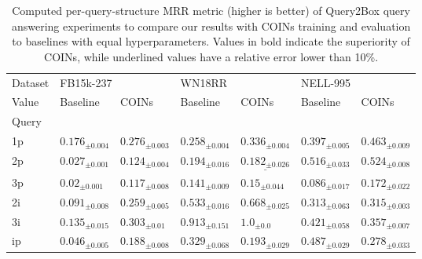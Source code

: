 \begin{table}[H]
  \caption[Computed per-query-structure MRR metric of Query2Box query answering experiments.]{Computed per-query-structure MRR metric (higher is better) of Query2Box query answering experiments to compare our results with COINs training and evaluation to baselines with equal hyperparameters. Values in bold indicate the superiority of COINs, while underlined values have a relative error lower than 10\%.}
  \label{tab:performance_query_answering_q2b}
  \centering
    \begin{adjustbox}{width=\textwidth}   
\begin{tabular}{lllllll}
\toprule
Dataset & \multicolumn{2}{l}{FB15k-237} & \multicolumn{2}{l}{WN18RR} & \multicolumn{2}{l}{NELL-995} \\
Value &                 Baseline &                           COINs &                 Baseline &                              COINs &                 Baseline &                             COINs \\
Query &                          &                                 &                          &                                    &                          &                                   \\
\midrule
1p    &  ${{0.176}_{\pm 0.004}}$ &  $\mathbf{{0.276}_{\pm 0.003}}$ &  ${{0.258}_{\pm 0.004}}$ &     $\mathbf{{0.336}_{\pm 0.004}}$ &  ${{0.397}_{\pm 0.005}}$ &    $\mathbf{{0.463}_{\pm 0.009}}$ \\
2p    &  ${{0.027}_{\pm 0.001}}$ &  $\mathbf{{0.124}_{\pm 0.004}}$ &  ${{0.194}_{\pm 0.016}}$ &  $\underline{{0.182}_{\pm 0.026}}$ &  ${{0.516}_{\pm 0.033}}$ &    $\mathbf{{0.524}_{\pm 0.008}}$ \\
3p    &   ${{0.02}_{\pm 0.001}}$ &  $\mathbf{{0.117}_{\pm 0.008}}$ &  ${{0.141}_{\pm 0.009}}$ &      $\mathbf{{0.15}_{\pm 0.044}}$ &  ${{0.086}_{\pm 0.017}}$ &    $\mathbf{{0.172}_{\pm 0.022}}$ \\
2i    &  ${{0.091}_{\pm 0.008}}$ &  $\mathbf{{0.259}_{\pm 0.005}}$ &  ${{0.533}_{\pm 0.016}}$ &     $\mathbf{{0.668}_{\pm 0.025}}$ &  ${{0.313}_{\pm 0.063}}$ &    $\mathbf{{0.315}_{\pm 0.003}}$ \\
3i    &  ${{0.135}_{\pm 0.015}}$ &   $\mathbf{{0.303}_{\pm 0.01}}$ &  ${{0.913}_{\pm 0.151}}$ &         $\mathbf{{1.0}_{\pm 0.0}}$ &  ${{0.421}_{\pm 0.058}}$ &           ${{0.357}_{\pm 0.007}}$ \\
ip    &  ${{0.046}_{\pm 0.005}}$ &  $\mathbf{{0.188}_{\pm 0.008}}$ &  ${{0.329}_{\pm 0.068}}$ &            ${{0.193}_{\pm 0.029}}$ &  ${{0.487}_{\pm 0.029}}$ &           ${{0.278}_{\pm 0.033}}$ \\

\end{tabular}
\end{adjustbox}
\end{table}
